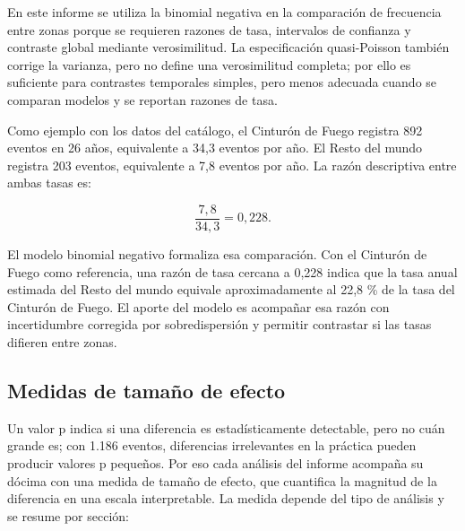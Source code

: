 \documentclass[
  spanish,
  letterpaper,
  DIV=11,
  numbers=noendperiod]{scrartcl}
\begin{document}
En este informe se utiliza la binomial negativa en la comparación de
frecuencia entre zonas porque se requieren razones de tasa, intervalos
de confianza y contraste global mediante verosimilitud. La
especificación quasi-Poisson también corrige la varianza, pero no define
una verosimilitud completa; por ello es suficiente para contrastes
temporales simples, pero menos adecuada cuando se comparan modelos y se
reportan razones de tasa.

Como ejemplo con los datos del catálogo, el Cinturón de Fuego registra
892 eventos en 26 años, equivalente a 34,3 eventos por año. El Resto del
mundo registra 203 eventos, equivalente a 7,8 eventos por año. La razón
descriptiva entre ambas tasas es:

\[
\frac{7{,}8}{34{,}3}=0{,}228.
\]

El modelo binomial negativo formaliza esa comparación. Con el Cinturón
de Fuego como referencia, una razón de tasa cercana a 0,228 indica que
la tasa anual estimada del Resto del mundo equivale aproximadamente al
22,8 \% de la tasa del Cinturón de Fuego. El aporte del modelo es
acompañar esa razón con incertidumbre corregida por sobredispersión y
permitir contrastar si las tasas difieren entre zonas.

\subsection{Medidas de tamaño de efecto}\label{sec-anexo-efecto}

Un valor p indica si una diferencia es estadísticamente detectable, pero
no cuán grande es; con 1.186 eventos, diferencias irrelevantes en la
práctica pueden producir valores p pequeños. Por eso cada análisis del
informe acompaña su dócima con una medida de tamaño de efecto, que
cuantifica la magnitud de la diferencia en una escala interpretable. La
medida depende del tipo de análisis y se resume por sección:
\end{document}
